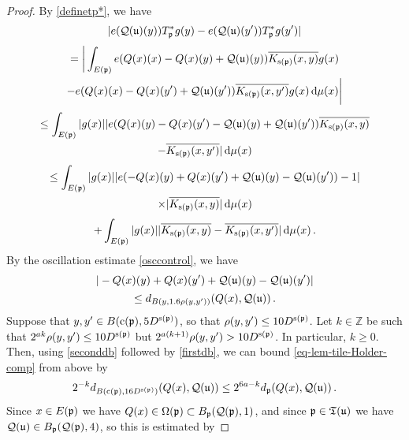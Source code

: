     \begin{proof}
        \leanok
        By \eqref{definetp*}, we have
        $$
            |e({\mathcal{Q}}({\mathfrak u})(y)) T_{{\mathfrak p}}^* g(y) - e({\mathcal{Q}}({\mathfrak u})(y')) T_{{\mathfrak p}}^* g(y')|
        $$
        \begin{multline*}
            =\bigg| \int_{E({\mathfrak p})} e({Q}(x)(x) - {Q}(x)(y) + {\mathcal{Q}}({\mathfrak u})(y)) \overline{K_{{\mathrm{s}}({\mathfrak p})}(x, y)} g(x) \\
            - e({Q}(x)(x) - {Q}(x)(y') + {\mathcal{Q}}({\mathfrak u})(y')) \overline{K_{{\mathrm{s}}({\mathfrak p})}(x, y')} g(x) \, \mathrm{d}\mu(x)\bigg|
        \end{multline*}
        \begin{multline*}
            \leq\int_{E({\mathfrak p})} |g(x)| |e({Q}(x)(y) - {Q}(x)(y') - {\mathcal{Q}}({\mathfrak u})(y) + {\mathcal{Q}}({\mathfrak u})(y'))\overline{K_{{\mathrm{s}}({\mathfrak p})}(x, y)}\\
            - \overline{K_{{\mathrm{s}}({\mathfrak p})}(x, y')}| \, \mathrm{d}\mu(x)
        \end{multline*}
        \begin{multline}
            \leq\int_{E({\mathfrak p})} |g(x)| |e(-{Q}(x)(y) + {Q}(x)(y') + {\mathcal{Q}}({\mathfrak u})(y) - {\mathcal{Q}}({\mathfrak u})(y')) - 1| \\
            \times |\overline{K_{{\mathrm{s}}({\mathfrak p})}(x, y)}|\, \mathrm{d}\mu(x) \label{T*Holder1b}
        \end{multline}
      \begin{equation}
            + \int_{E({\mathfrak p})} |g(x)| |\overline{K_{{\mathrm{s}}({\mathfrak p})}(x, y)} - \overline{K_{{\mathrm{s}}({\mathfrak p})}(x, y')} |\, \mathrm{d}\mu(x)\,.\label{T*Holder1}
        \end{equation}
        By the oscillation estimate \eqref{osccontrol}, we have
        $$
            |-{Q}(x)(y) + {Q}(x)(y') + {\mathcal{Q}}({\mathfrak u})(y) - {\mathcal{Q}}({\mathfrak u})(y')|
        $$
      \begin{equation}
            \label{eq-lem-tile-Holder-comp}
            \le d_{B(y, 1.6\rho(y,y'))}({Q}(x), {\mathcal{Q}}({\mathfrak u}))\,.
        \end{equation}
        Suppose that $y, y' \in B({\mathrm{c}}({\mathfrak p}), 5D^{{\mathrm{s}}({\mathfrak p})})$, so that $\rho(y,y') \le 10D^{{\mathrm{s}}({\mathfrak p})}$.
        Let $k \in \mathbb{Z}$ be such that $2^{ak}\rho(y,y') \le 10D^{{\mathrm{s}}({\mathfrak p})}$ but $2^{a(k+1)} \rho(y,y') > 10D^{{\mathrm{s}}({\mathfrak p})}$.
        In particular, $k \ge 0$. Then, using \eqref{seconddb} followed by \eqref{firstdb}, we can bound \eqref{eq-lem-tile-Holder-comp} from above by
        $$
            2^{-k} d_{B({\mathrm{c}}({\mathfrak p}), 16 D^{{\mathrm{s}}({\mathfrak p})})}({Q}(x), {\mathcal{Q}}({\mathfrak u})) \le 2^{6a - k} d_{{\mathfrak p}}({Q}(x), {\mathcal{Q}}({\mathfrak u}))\,.
        $$
        Since $x \in E({\mathfrak p})$ we have ${Q}(x) \in \Omega({\mathfrak p}) \subset B_{{\mathfrak p}}({\mathcal{Q}}({\mathfrak p}), 1)$, and since ${\mathfrak p} \in {\mathfrak T}({\mathfrak u})$ we have ${\mathcal{Q}}({\mathfrak u}) \in B_{{\mathfrak p}}({\mathcal{Q}}({\mathfrak p}), 4)$, so this is estimated by

\end{proof}
